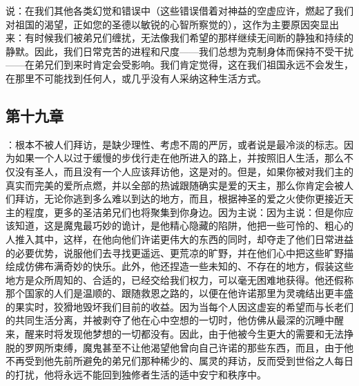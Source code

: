 说：在我们其他各类幻觉和错误中（这些错误借着对神益的空虚应许，燃起了我们对祖国的渴望，正如您的圣德以敏锐的心智所察觉的），这作为主要原因突显出来：有时候我们被弟兄们缠扰，无法像我们希望的那样继续无间断的静独和持续的静默。因此，我们日常克苦的进程和尺度——我们总想为克制身体而保持不受干扰——在弟兄们到来时肯定会受影响。我们肯定觉得，这在我们祖国永远不会发生，在那里不可能找到任何人，或几乎没有人采纳这种生活方式。\par


\subsection{第十九章}

\par

：根本不被人们拜访，是缺少理性、考虑不周的严厉，或者说是最冷淡的标志。因为如果一个人以过于缓慢的步伐行走在他所进入的路上，并按照旧人生活，那么不仅没有圣人，而且没有一个人应该拜访他，这是对的。但是，如果你被对我们主的真实而完美的爱所点燃，并以全部的热诚跟随确实是爱的天主，那么你肯定会被人们拜访，无论你逃到多么难以到达的地方，而且，根据神圣的爱之火使你更接近天主的程度，更多的圣洁弟兄们也将聚集到你身边。因为主说：因为主说：但是你应该知道，这是魔鬼最巧妙的诡计，是他精心隐藏的陷阱，他把一些可怜的、粗心的人推入其中，这样，在他向他们许诺更伟大的东西的同时，却夺走了他们日常进益的必要优势，说服他们去寻找更遥远、更荒凉的旷野，并在他们心中把这些旷野描绘成仿佛布满奇妙的快乐。此外，他还捏造一些未知的、不存在的地方，假装这些地方是众所周知的、合适的，已经交给我们权力，可以毫无困难地获得。他还假称那个国家的人们是温顺的、跟随救恩之路的，以便在他许诺那里为灵魂结出更丰盛的果实时，狡猾地毁坏我们目前的收益。因为当每个人因这虚妄的希望而与长老们的共同生活分离，并被剥夺了他在心中空想的一切时，他仿佛从最深的沉睡中醒来，醒来时将发现他梦想的一切都没有。因此，由于他被今生更大的需要和无法挣脱的罗网所束缚，魔鬼甚至不让他渴望他曾向自己许诺的那些东西，而且，由于他不再受到他先前所避免的弟兄们那种稀少的、属灵的拜访，反而受到世俗之人每日的打扰，他将永远不能回到独修者生活的适中安宁和秩序中。\par


